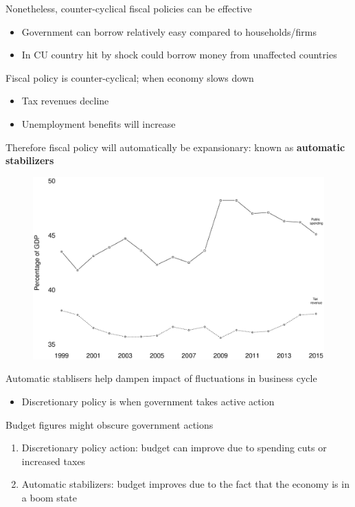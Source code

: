 \documentclass{beamer}
\begin{document}
\begin{frame}
 Nonetheless, counter-cyclical fiscal policies can be effective
  \begin{itemize}
    \item Government can borrow relatively easy compared to households/firms
    \item In CU country hit by shock could borrow money from unaffected countries
  \end{itemize}
  \medskip
  Fiscal policy is counter-cyclical; when economy slows down
  \begin{itemize}
    \item Tax revenues decline
    \item Unemployment benefits will increase
  \end{itemize}  
  \medskip
  Therefore fiscal policy will automatically be expansionary: known as \textbf{automatic stabilizers}  
\end{frame}

\begin{frame}
  \begin{figure}
    \includegraphics[scale=.3]{automatic_stabilisers.eps}
  \end{figure}
\end{frame}

\begin{frame}
 Automatic stablisers help dampen impact of fluctuations in business cycle
  \begin{itemize}
    \item Discretionary policy is when government takes active action
  \end{itemize}
  \medskip
  Budget figures might obscure government actions  
\begin{enumerate}
  \item Discretionary policy action: budget can improve due to spending cuts or increased taxes
  \item Automatic stabilizers: budget improves due to the fact that the economy is in a boom state
\end{enumerate}
\end{frame}
\end{document}
